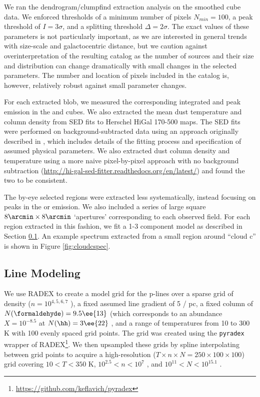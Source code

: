 We ran the dendrogram/clumpfind extraction analysis on the smoothed
\threeohthree cube data.  We enforced thresholds of a minimum number of pixels
$N_{min}=100$, a peak threshold of $I = 3\sigma$, and a splitting threshold
$\Delta = 2\sigma$.  The exact values of these parameters is not particularly
important, as we are interested in general trends with size-scale and
galactocentric distance, but we caution against overinterpretation of the
resulting catalog as the number of sources and their size and distribution can
change dramatically with small changes in the selected parameters.  The number
and location of pixels included in the catalog is, however, relatively robust
against small parameter changes.

For each extracted blob, we measured the corresponding integrated and peak
emission in the \threetwoone and \thirteenco cubes.  We also extracted the mean
dust temperature and column density from SED fits to Herschel HiGal 170-500\um
maps.  The SED fits were performed on background-subtracted data using an
approach originally described in \citet{Battersby2011a}, which includes details
of the fitting process and specification of assumed physical parameters.  We
also extracted dust column density and temperature using a more naive
pixel-by-pixel approach with no background subtraction
(\url{http://hi-gal-sed-fitter.readthedocs.org/en/latest/}) and found the two
to be consistent.

The by-eye selected regions were extracted less systematically, instead
focusing on peaks in the \threeohthree or \threetwoone emission.  We also
included a series of large square $8\arcmin \times 8\arcmin$ `apertures'
corresponding to each observed field.  For each region extracted in this
fashion, we fit a 1-3 component model as described in Section
\ref{sec:linemodeling}.  An example spectrum extracted from a small region
around ``cloud c'' is shown in Figure \ref{fig:cloudcspec}.


\subsection{Line Modeling}
\label{sec:linemodeling}
We use RADEX \citet{van-Der-Tak2007a} to create a model grid for the
p-\formaldehyde lines over a sparse grid of density ($n=10^{4,5,6,7}$ \percc),
a fixed assumed line gradient of 5 \kms / pc, a fixed column of \formaldehyde
$N(\formaldehyde) = 9.5\ee{13}$ \persc (which corresponds to an abundance
$X=10^{-8.5}$ at $N(\hh) = 3\ee{22}$ \persc, and a range of temperatures from
10 to 300 K with 100 evenly spaced grid points.  The grid was created using
the \texttt{pyradex} wrapper of
RADEX\footnote{\url{https://github.com/keflavich/pyradex}}.
We then upsampled these grids by spline interpolating between grid points to
acquire a high-resolution ($T\times n \times N = 250\times100\times100$) grid
covering $10<T<350$ K, $10^{2.5} < n < 10^7$ \percc, and $10^{11} < N <
10^{15.1}$ \persc\perkmspc.

